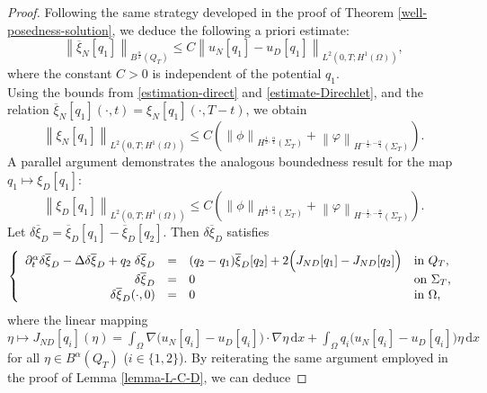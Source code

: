 \documentclass[a4paper,12pt,reqno,natbib]{amsart}
\newcommand{\dx} {\displaystyle\mathrm{d}x}
\begin{document}
{\begin{proof}
\noindent Following the same strategy developed in the proof of Theorem \ref{well-posedness-solution}, we deduce the following a priori estimate:
\begin{equation*}%
\left\| \overline{\xi}_N[q_1] \right\|_{B^{\frac{\alpha}{2}}(Q_T)} \leq C \left\| u_N[q_1]- u_D[q_1] \right\|_{L^2(0,T;H^1(\Omega))},
\end{equation*}
where the constant $C > 0$ is independent of the potential $q_1$.\\
Using the bounds from \eqref{estimation-direct} and \eqref{estimate-Direchlet}, and the relation \(\overline{\xi}_N[q_1](\cdot, t) = \xi_N[q_1](\cdot, T - t)\), we obtain
\begin{equation*}%
    \left\| \xi_N[q_1] \right\|_{L^2(0,T;H^1(\Omega))} \leq C\left( \left\|\phi\right\|_{H^{\frac{1}{2},\frac{\alpha}{4}}(\Sigma_T)} + \left\|\varphi\right\|_{H^{-\frac{1}{2}, -\frac{\alpha}{4}}(\Sigma_T)} \right).
\end{equation*}
A parallel argument demonstrates the analogous boundedness result for the map \(q_1 \mapsto \xi_D[q_1]\):
\begin{equation*} %
    \left\| \xi_D[q_1] \right\|_{L^2(0,T;H^1(\Omega))} \leq C\left( \left\|\phi\right\|_{H^{\frac{1}{2},\frac{\alpha}{4}}(\Sigma_T)} + \left\|\varphi\right\|_{H^{-\frac{1}{2}, -\frac{\alpha}{4}}(\Sigma_T)} \right).
\end{equation*}
Let \(\delta \overline{\xi}_D = \overline{\xi}_D[q_1] - \overline{\xi}_D[q_2]\). Then \(\delta \overline{\xi}_D\) satisfies
 \begin{eqnarray*} %
\left\{
  \begin{array}{rcll}
    \partial^\alpha _{t} \delta \overline{\xi}_D   -\Delta \delta \overline{\xi}_D +q_2\;\delta \overline{\xi}_D&=&(q_2-q_1) \overline{\xi}_D[q_2] +2\Big(J_{ND}[q_1] -J_{ND}[q_2]\Big)&\hbox{in}\ Q_T, \\
    \displaystyle  \delta \overline{\xi}_D &=&0 &\hbox{on}\  \Sigma_T, \\
    \displaystyle \delta \overline{\xi}_D (\cdot,0)&=&0  &\hbox{in}\ \Omega,
  \end{array}
\right.
\end{eqnarray*}
where the linear mapping $\eta\longmapsto J_{ND}[q_i](\eta)=\displaystyle\int_{\Omega}
 \nabla \Big(u_N[q_i]-u_D[q_i]\Big)\cdot\nabla \eta\,\dx+\int_{\Omega}q_i \Big(u_N[q_i]-u_D[q_i]\Big)\eta\, \dx$ for all $\eta\in B^\alpha(Q_T)$ ($i\in\{1,2\}$).
By reiterating the same argument employed in the proof of Lemma \ref{lemma-L-C-D}, we can deduce

\end{proof}}
\end{document}
